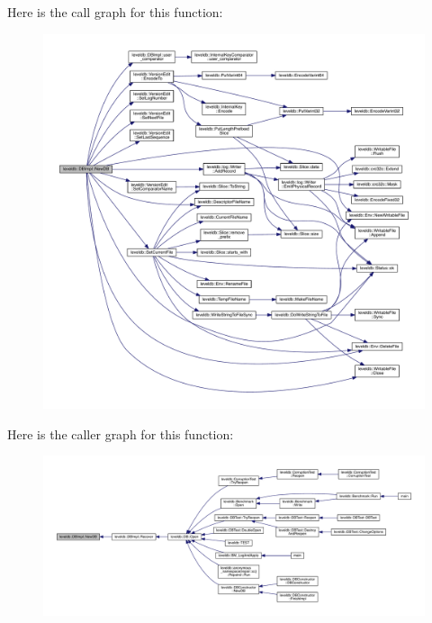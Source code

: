 Here is the call graph for this function\+:\nopagebreak
\begin{figure}[H]
\begin{center}
\leavevmode
\includegraphics[width=350pt]{classleveldb_1_1_d_b_impl_acfd8ee23923b6a2afb3016831d751b9b_cgraph}
\end{center}
\end{figure}




Here is the caller graph for this function\+:
\nopagebreak
\begin{figure}[H]
\begin{center}
\leavevmode
\includegraphics[width=350pt]{classleveldb_1_1_d_b_impl_acfd8ee23923b6a2afb3016831d751b9b_icgraph}
\end{center}
\end{figure}


\hypertarget{classleveldb_1_1_d_b_impl_af4cf17ab446a4797270aad502f1c3f3d}{}

